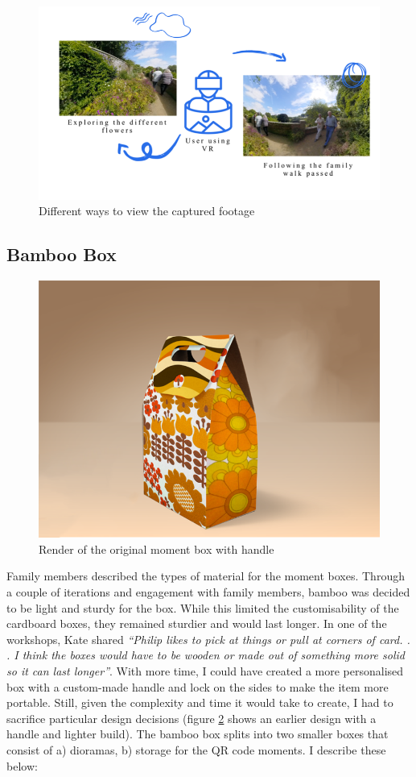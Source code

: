 \begin{figure}[htp]
\centering
\includegraphics[width=.8\linewidth]{Images/ChapterFour/WaysToViewCapturedFootage.png}
\caption{Different ways to view the captured footage}
\label{fig:capturedFootage}
\end{figure}

\subsection{Bamboo Box}
\label{Bamboo box}

\begin{figure}[htp]
\centering
\includegraphics[width=.6\linewidth]{Images/ChapterFour/originalDesign.png}
\caption{Render of the original moment box with handle}
\label{fig:oldDesign}
\end{figure}
Family members described the types of material for the moment boxes. Through a couple of iterations and engagement with family members, bamboo was decided to be light and sturdy for the box. While this limited the customisability of the cardboard boxes, they remained sturdier and would last longer. In one of the workshops, Kate shared \textit{``Philip likes to pick at things or pull at corners of card. . . I think the boxes would have to be wooden or made out of something more solid so it can last longer''}. With more time, I could have created a more personalised box with a custom-made handle and lock on the sides to make the item more portable. Still, given the complexity and time it would take to create, I had to sacrifice particular design decisions (figure \ref{fig:oldDesign} shows an earlier design with a handle and lighter build). The bamboo box splits into two smaller boxes that consist of a) dioramas, b) storage for the QR code moments. I describe these below:


